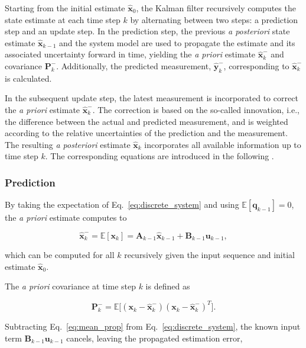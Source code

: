 Starting from the initial estimate $\hat{\bm{x}}_0$, the Kalman filter recursively computes the state estimate at each time step $k$ by alternating between two steps: a prediction step and an update step. In the prediction step, the previous \emph{a posteriori} state estimate $\hat{\bm{x}}_{k-1}$ and the system model are used to propagate the estimate and its associated uncertainty forward in time, yielding the \emph{a priori} estimate $\hat{\bm{x}}_k^-$ and covariance $\bm{P}_k^-$.  Additionally, the predicted measurement, $\hat{\bm{y}}_k^-$, corresponding to $\hat{\bm{x}}_k^-$ is calculated.

In the subsequent update step, the latest measurement is incorporated to correct the \emph{a priori} estimate $\hat{\bm{x}}_k^-$. The correction is based on the so-called innovation, i.e., the difference between the actual and predicted measurement, and is weighted according to the relative uncertainties of the prediction and the measurement. The resulting \emph{a posteriori} estimate $\hat{\bm{x}}_k$ incorporates all available information up to time step $k$.
The corresponding equations are introduced in the following \cite{Särkkä2013KF}.





\subsubsection{Prediction}

By taking the expectation of Eq.~\eqref{eq:discrete_system} and using $\mathbb{E}[\bm{q}_{k-1}] = 0$, the \emph{a priori} estimate computes to

\begin{equation}
	\hat{\bm{x}}_{k}^- 
	= 
	\mathbb{E}[\bm{x}_{k}] 
	= 
	\bm{A}_{k-1} \hat{\bm{x}}_{k-1} + \bm{B}_{k-1} \bm{u}_{k-1},
	\label{eq:mean_prop}
\end{equation}

which can be computed for all $k$ recursively given the input sequence and initial estimate $\hat{\bm{x}}_0$.

The \emph{a priori} covariance at time step $k$ is defined as

\begin{equation}
	\bm{P}_{k}^- 
	= 
	\mathbb{E}\big[ \left( \bm{x}_{k} - \hat{\bm{x}}_k^- \right) \left( \bm{x}_{k} - \hat{\bm{x}}_k^- \right)^T\big].
	\label{eq:cov_prop_def}
\end{equation}

Subtracting Eq.~\eqref{eq:mean_prop} from Eq.~\eqref{eq:discrete_system}, the known input term $\bm{B}_{k-1} \bm{u}_{k-1}$ cancels, leaving the propagated estimation error,

